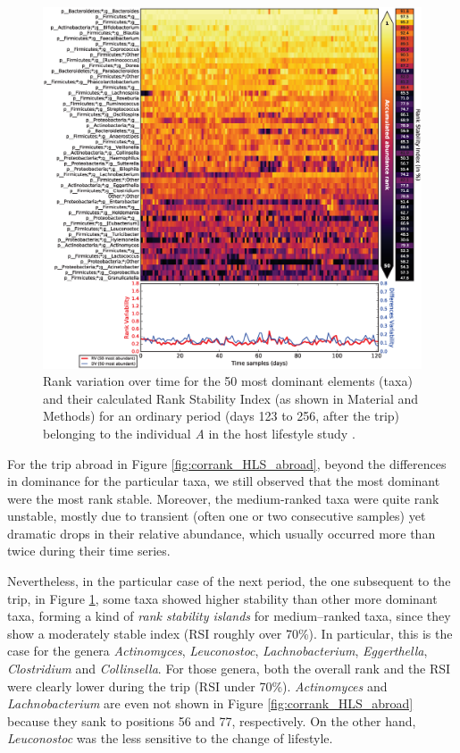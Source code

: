\begin{figure}
	\centering
	\includegraphics[width=1.0\textwidth]{figs/Fig5.eps}
	\caption{Rank variation over time for the 50 most dominant elements (taxa) and their calculated Rank Stability Index (as shown in Material and Methods) for an ordinary period (days 123 to 256, after the trip) belonging to the individual \emph{A} in the host lifestyle study \cite{hostlife}.}
	\label{fig:corrank_HLS_returned}
\end{figure}

For the trip abroad in Figure \ref{fig:corrank_HLS_abroad}, beyond the differences in dominance for the particular taxa, we still observed that the most dominant were the most rank stable. Moreover, the medium-ranked taxa were quite rank unstable, mostly due to transient (often one or two consecutive samples) yet dramatic drops in their relative abundance, which usually occurred more than twice during their time series.

Nevertheless, in the particular case of the next period, the one subsequent to the trip, in Figure \ref{fig:corrank_HLS_returned}, some taxa showed higher stability than other more dominant taxa, forming a kind of \emph{rank stability islands} for medium--ranked taxa, since they show a moderately stable index (RSI roughly over 70\%). In particular, this is the case for the genera \emph{Actinomyces}, \emph{Leuconostoc}, \emph{Lachnobacterium}, \emph{Eggerthella}, \emph{Clostridium} and	\emph{Collinsella}. For those genera, both the overall rank and the RSI were clearly lower during the trip (RSI under 70\%). \emph{Actinomyces} and \emph{Lachnobacterium} are even not shown in Figure \ref{fig:corrank_HLS_abroad} because they sank to positions 56 and 77, respectively. On the other hand, \emph{Leuconostoc} was the less sensitive to the change of lifestyle.  

